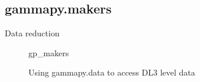 \subsection{gammapy.makers}
\label{ssec:gammapy-makers}
Data reduction

\begin{figure}
	{gp_makers}

	\caption{Using gammapy.data to access DL3 level data}
	\label{ig*:minted:gp_makers}
\end{figure}
